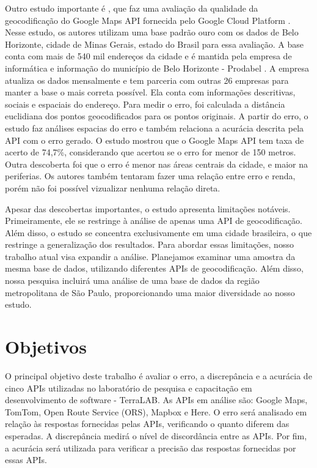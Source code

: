 Outro estudo importante é \cite{Clodoveu2011}, que faz uma avaliação da qualidade da geocodificação do Google Maps API fornecida pelo Google Cloud Platform \cite{GCP}. Nesse estudo, os autores utilizam uma base padrão ouro com os dados de Belo Horizonte, cidade de Minas Gerais, estado do Brasil para essa avaliação. A base conta com mais de 540 mil endereços da cidade e é mantida pela empresa de informática e informação do município de Belo Horizonte - Prodabel \cite{Prodabel}. A empresa atualiza os dados mensalmente e tem parceria com outras 26 empresas para manter a base o mais correta possível. Ela conta com informações descritivas, sociais e espaciais do endereço. Para medir o erro, foi calculada a distância euclidiana dos pontos geocodificados para os pontos originais. A partir do erro, o estudo faz análises espacias do erro e também relaciona a acurácia descrita pela API com o erro gerado. O estudo mostrou que o Google Maps API tem taxa de acerto de 74,7\%, considerando que acertou se o erro for menor de 150 metros. Outra descoberta foi que o erro é menor nas áreas centrais da cidade, e maior na periferias. Os autores também tentaram fazer uma relação entre erro e renda, porém não foi possível vizualizar nenhuma relação direta.

Apesar das descobertas importantes, o estudo apresenta limitações notáveis. Primeiramente, ele se restringe à análise de apenas uma API de geocodificação. Além disso, o estudo se concentra exclusivamente em uma cidade brasileira, o que restringe a generalização dos resultados. Para abordar essas limitações, nosso trabalho atual visa expandir a análise. Planejamos examinar uma amostra da mesma base de dados, utilizando diferentes APIs de geocodificação. Além disso, nossa pesquisa incluirá uma análise de uma base de dados da região metropolitana de São Paulo, proporcionando uma maior diversidade ao nosso estudo.

\section{Objetivos}

O principal objetivo deste trabalho é avaliar o erro, a discrepância e a acurácia de cinco APIs utilizadas no laboratório de pesquisa e capacitação em desenvolvimento de software - TerraLAB. As APIs em análise são: Google Maps, TomTom, Open Route Service (ORS), Mapbox e Here. O erro será analisado em relação às respostas fornecidas pelas APIs, verificando o quanto diferem das esperadas. A discrepância medirá o nível de discordância entre as APIs. Por fim, a acurácia será utilizada para verificar a precisão das respostas fornecidas por essas APIs.
    
